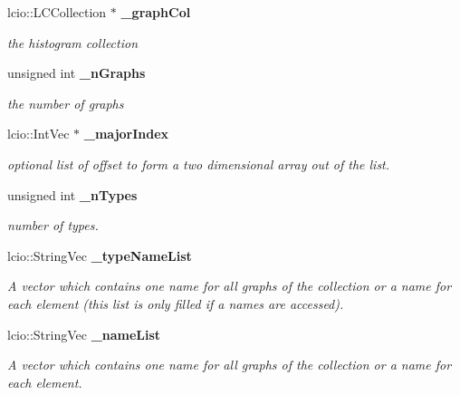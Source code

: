 \begin{DoxyCompactItemize}
\item 
lcio::LCCollection $\ast$ {\bf \_\-graphCol}\label{classhistmgr_1_1GraphCollection__t_a1196d28c374dfd4e4fdd291542b392f2}

\begin{DoxyCompactList}\small\item\em the histogram collection \item\end{DoxyCompactList}\item 
unsigned int {\bf \_\-nGraphs}\label{classhistmgr_1_1GraphCollection__t_ab839badb20a05434321be1bf9ff36831}

\begin{DoxyCompactList}\small\item\em the number of graphs \item\end{DoxyCompactList}\item 
lcio::IntVec $\ast$ {\bf \_\-majorIndex}
\begin{DoxyCompactList}\small\item\em optional list of offset to form a two dimensional array out of the list. \item\end{DoxyCompactList}\item 
unsigned int {\bf \_\-nTypes}
\begin{DoxyCompactList}\small\item\em number of types. \item\end{DoxyCompactList}\item 
lcio::StringVec {\bf \_\-typeNameList}
\begin{DoxyCompactList}\small\item\em A vector which contains one name for all graphs of the collection or a name for each element (this list is only filled if a names are accessed). \item\end{DoxyCompactList}\item 
lcio::StringVec {\bf \_\-nameList}
\begin{DoxyCompactList}\small\item\em A vector which contains one name for all graphs of the collection or a name for each element. \item\end{DoxyCompactList}\end{DoxyCompactItemize}
